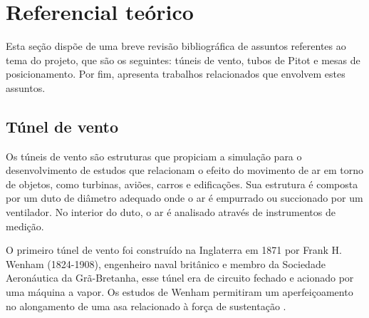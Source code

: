 \chapter{Referencial teórico}\label{ch:referencial}

Esta seção dispõe de uma breve revisão bibliográfica de assuntos referentes ao tema do projeto, que são 
os seguintes: túneis de vento, tubos de Pitot e mesas de posicionamento. Por fim, apresenta trabalhos 
relacionados que envolvem estes assuntos.

\section{Túnel de vento}\label{sec:tunel}

%
%
%

Os túneis de vento são estruturas que propiciam a simulação para o desenvolvimento de estudos que relacionam 
o efeito do movimento de ar em torno de objetos, como turbinas, aviões, carros e edificações. Sua estrutura 
é composta por um duto de diâmetro adequado onde o ar é empurrado ou succionado por um ventilador. No 
interior do duto, o ar é analisado através de instrumentos de medição.

O primeiro túnel de vento foi construído na Inglaterra em 1871 por Frank H. Wenham (1824-1908), engenheiro 
naval britânico e membro da Sociedade Aeronáutica da Grã-Bretanha, esse túnel era de circuito fechado e 
acionado por uma máquina a vapor. Os estudos de Wenham permitiram um aperfeiçoamento no alongamento de 
uma asa relacionado à força de sustentação \cite{carminatti2019desenvolvimento}.

